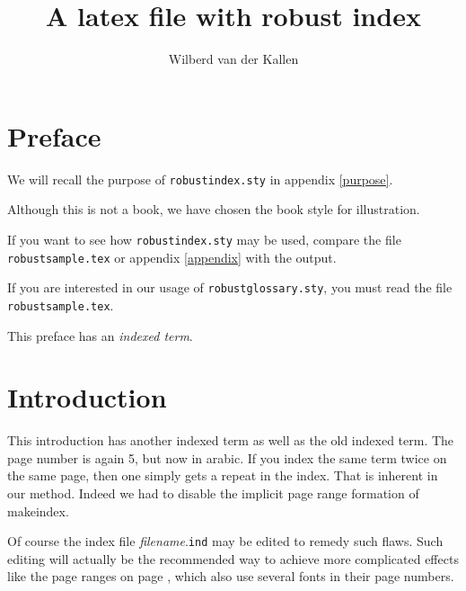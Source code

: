 \documentclass{book}
\title {A latex file with robust index}
\author{Wilberd van der Kallen\index{Wilberd}}
\date{}
\begin{document}
\renewcommand\thepage{\roman{page}}

\maketitle

\tableofcontents
{}

\chapter*{Preface}
We will recall the purpose of  \verb|robustindex.sty| in appendix
\ref{purpose}.

Although this is not a book, we have chosen the book style for illustration.

If you want to see how \verb|robustindex.sty| may be used, compare the file
\verb|robustsample.tex| or appendix \ref{appendix} with the output.

If you are interested in our usage of \verb|robustglossary.sty|, you must read
the file \verb|robustsample.tex|.

This preface has an \emph{indexed term}.


\chapter{Introduction}\sloppy
\renewcommand\thepage{\arabic{page}}
\addtocounter{page}{-2}%
This introduction has another indexed term
as well as the old indexed term.
The page number is again 5, but now in arabic.
If you index the same term twice on the same page, then one simply gets
a repeat in the index.
That is inherent in our method.
Indeed we had to disable the implicit page range formation of makeindex.

Of course the index file {\it filename}.\texttt{ind}
may be edited to remedy such flaws. Such editing will actually be the
recommended way to achieve more complicated effects like the page ranges on
page \pageref{range}, which also use several fonts in their page numbers.
\end{document}
